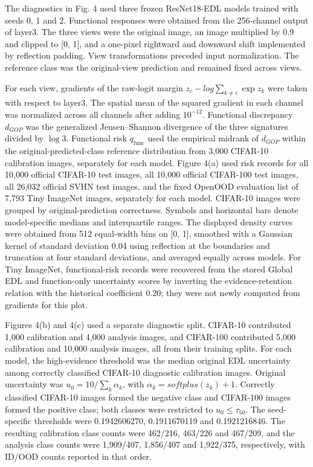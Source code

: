 \documentclass[11pt,a4paper]{article}
\begin{document}
The diagnostics in Fig. 4 used three frozen ResNet18-EDL models trained with seeds 0, 1 and 2. Functional responses were obtained from the 256-channel output of layer3. The three views were the original image, an image multiplied by 0.9 and clipped to {[}0, 1{]}, and a one-pixel rightward and downward shift implemented by reflection padding. View transformations preceded input normalization. The reference class was the original-view prediction and remained fixed across views.

For each view, gradients of the raw-logit margin \(z_{c} - log\sum_{k \neq c}^{}\exp z_{k}\) were taken with respect to layer3. The spatial mean of the squared gradient in each channel was normalized across all channels after adding \(10^{- 12}\). Functional discrepancy \(d_{GOP}\) was the generalized Jensen--Shannon divergence of the three signatures divided by \(\log 3\). Functional risk \(q_{\text{func}}\) used the empirical midrank of \(d_{GOP}\) within the original-predicted-class reference distribution from 3,000 CIFAR-10 calibration images, separately for each model. Figure 4(a) used risk records for all 10,000 official CIFAR-10 test images, all 10,000 official CIFAR-100 test images, all 26,032 official SVHN test images, and the fixed OpenOOD evaluation list of 7,793 Tiny ImageNet images, separately for each model. CIFAR-10 images were grouped by original-prediction correctness. Symbols and horizontal bars denote model-specific medians and interquartile ranges. The displayed density curves were obtained from 512 equal-width bins on {[}0, 1{]}, smoothed with a Gaussian kernel of standard deviation 0.04 using reflection at the boundaries and truncation at four standard deviations, and averaged equally across models. For Tiny ImageNet, functional-risk records were recovered from the stored Global EDL and function-only uncertainty scores by inverting the evidence-retention relation with the historical coefficient 0.20; they were not newly computed from gradients for this plot.

Figures 4(b) and 4(c) used a separate diagnostic split. CIFAR-10 contributed 1,000 calibration and 4,000 analysis images, and CIFAR-100 contributed 5,000 calibration and 10,000 analysis images, all from their training splits. For each model, the high-evidence threshold was the median original EDL uncertainty among correctly classified CIFAR-10 diagnostic calibration images. Original uncertainty was \(u_{0} = 10/\sum_{k}^{}\alpha_{k}\), with \(\alpha_{k} = softplus\left( z_{k} \right) + 1\). Correctly classified CIFAR-10 images formed the negative class and CIFAR-100 images formed the positive class; both classes were restricted to \(u_{0} \leq \tau_{50}\). The seed-specific thresholds were 0.1942606270, 0.1911670119 and 0.1921216846. The resulting calibration class counts were 462/216, 463/226 and 467/209, and the analysis class counts were 1,909/407, 1,856/407 and 1,922/375, respectively, with ID/OOD counts reported in that order.
\end{document}
